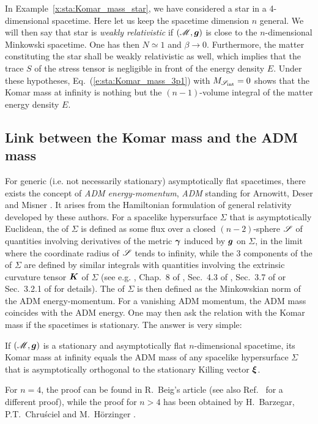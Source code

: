\begin{example}
\label{x:sta:Komar_mass_star_dim_n}
In Example~\ref{x:sta:Komar_mass_star}, we have considered a star
in a 4-dimensional spacetime. Here let us keep the spacetime dimension $n$
general. We will then say that star is \emph{weakly relativistic}
if $(\mathscr{M},\bm{g})$ is close to
the $n$-dimensional Minkowski spacetime. One has then $N\simeq 1$ and
$\beta \to 0$. Furthermore,
the matter constituting the star shall
be weakly relativistic as well, which implies that the trace $S$ of the stress
tensor is negligible in front of the energy density $E$. Under these
hypotheses, Eq.~(\ref{e:sta:Komar_mass_3p1}) with $M_{\mathscr{S}_{\rm int}} =0$
shows that the Komar mass at infinity is nothing but the $(n-1)$-volume integral of
the matter energy density $E$.
\end{example}

\subsection{Link between the Komar mass and the ADM mass}  \label{s:sta:Komar_ADM}

For generic (i.e. not necessarily stationary) asymptotically flat spacetimes,
there exists the concept of \emph{ADM energy-momentum}, \emph{ADM} standing for
Arnowitt, Deser and Misner \cite{ArnowDM62}. It arises from the Hamiltonian
formulation of general relativity developed by these authors.
For a spacelike hypersurface $\Sigma$ that is asymptotically Euclidean,
the  of $\Sigma$ is defined
as some flux over a closed $(n-2)$-sphere $\mathscr{S}$ of quantities involving derivatives
of the metric $\bm{\gamma}$ induced by $\bm{g}$ on $\Sigma$, in the limit where
the coordinate radius of $\mathscr{S}$ tends to infinity, while the
3 components of the 
of $\Sigma$ are defined by similar integrals with quantities involving the extrinsic curvature
tensor $\bm{K}$ of $\Sigma$ (see e.g. \cite{JaramG11},
Chap.~8 of \cite{Gourg12}, Sec.~4.3 of \cite{Poiss04},
Sec.~3.7 of \cite{Strau13} or Sec.~3.2.1 of \cite{Szaba09} for details).
The  of $\Sigma$
is then defined as the Minkowskian norm of the ADM energy-momentum.
For a vanishing ADM momentum, the ADM mass coincides with the ADM energy.
One may then ask the relation with the Komar mass if the spacetimes is stationary.
The answer is very simple:
\begin{prop}
\label{p:sta:Komar_ADM_mass}
If $(\mathscr{M},\bm{g})$ is a stationary and asymptotically flat $n$-dimensional spacetime,
its Komar mass at infinity equals the ADM mass of any spacelike hypersurface
$\Sigma$ that is asymptotically orthogonal to the stationary Killing vector $\bm{\xi}$.
\end{prop}
For $n=4$, the proof can be found in R.~Beig's article \cite{Beig78}
(see also Ref.~\cite{AshteM79} for a different proof), while the proof
for $n>4$ has been obtained by H.~Barzegar, P.T.~Chruściel and M.~Hörzinger \cite{BarzgCH17}.

